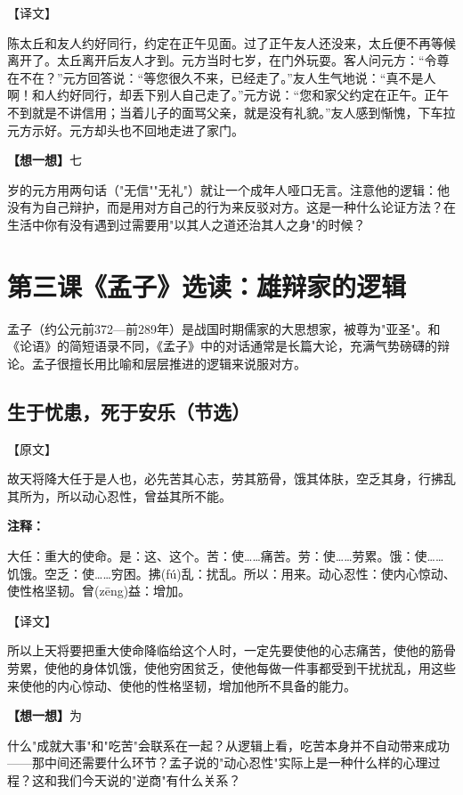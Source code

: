 \documentclass[a4paper,12pt]{ctexart}
\newcommand{\annlist}[1]{{\vspace{0.15cm}\noindent\textcolor{orange!80!black}{\small\bfseries 注释：}\par\footnotesize #1\par}}
\newcommand{\thinkq}[1]{\vspace{0.2cm}\noindent\textcolor{orange!60!black}{\small\bfseries【想一想】}{\small #1}\par}
\begin{document}
\noindent\textcolor{green!60!black}{\large【译文】}

陈太丘和友人约好同行，约定在正午见面。过了正午友人还没来，太丘便不再等候离开了。太丘离开后友人才到。元方当时七岁，在门外玩耍。客人问元方：\textquotedblleft 令尊在不在？\textquotedblright 元方回答说：\textquotedblleft 等您很久不来，已经走了。\textquotedblright 友人生气地说：\textquotedblleft 真不是人啊！和人约好同行，却丢下别人自己走了。\textquotedblright 元方说：\textquotedblleft 您和家父约定在正午。正午不到就是不讲信用；当着儿子的面骂父亲，就是没有礼貌。\textquotedblright 友人感到惭愧，下车拉元方示好。元方却头也不回地走进了家门。

\thinkq 七岁的元方用两句话（"无信""无礼"）就让一个成年人哑口无言。注意他的逻辑：他没有为自己辩护，而是用对方自己的行为来反驳对方。这是一种什么论证方法？在生活中你有没有遇到过需要用"以其人之道还治其人之身"的时候？

\newpage

\section{\textcolor{orange!80!black}{第三课\quad 《孟子》选读：雄辩家的逻辑}}

孟子（约公元前372—前289年）是战国时期儒家的大思想家，被尊为"亚圣"。和《论语》的简短语录不同，《孟子》中的对话通常是长篇大论，充满气势磅礴的辩论。孟子很擅长用比喻和层层推进的逻辑来说服对方。

\subsection*{生于忧患，死于安乐（节选）}

\noindent\textcolor{blue!70!black}{\large【原文】}

故天将降大任于是人也，必先苦其心志，劳其筋骨，饿其体肤，空乏其身，行拂乱其所为，所以动心忍性，曾益其所不能。

\annlist{大任：重大的使命。是：这、这个。苦：使……痛苦。劳：使……劳累。饿：使……饥饿。空乏：使……穷困。拂(fú)乱：扰乱。所以：用来。动心忍性：使内心惊动、使性格坚韧。曾(zēng)益：增加。}

\noindent\textcolor{green!60!black}{\large【译文】}

所以上天将要把重大使命降临给这个人时，一定先要使他的心志痛苦，使他的筋骨劳累，使他的身体饥饿，使他穷困贫乏，使他每做一件事都受到干扰扰乱，用这些来使他的内心惊动、使他的性格坚韧，增加他所不具备的能力。

\thinkq 为什么"成就大事"和"吃苦"会联系在一起？从逻辑上看，吃苦本身并不自动带来成功——那中间还需要什么环节？孟子说的"动心忍性"实际上是一种什么样的心理过程？这和我们今天说的"逆商"有什么关系？
\end{document}
